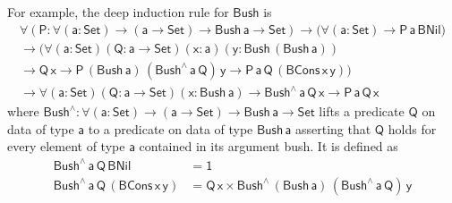 \documentclass[acmsmall,screen,review,anonymous]{acmart}
\theoremstyle{definition}
\begin{document}
For example, the deep induction rule for $\mathsf{Bush}$ is
\begin{multline*}
\mathsf{\forall (P : \forall (a : Set) \to (a \to Set) \to Bush\, a \to Set)
\to \big( \forall (a : Set) \to P\,a\,BNil \big)} \\
\mathsf{\to \big( \forall (a : Set) (Q : a \to Set) (x : a) (y : Bush\,(Bush\,a))} \\
\mathsf{\to Q\,x \to P\,(Bush\,a)\,(Bush^{\wedge}\,a\,Q)\,y \to P\,a\,Q\,(BCons\,x\,y) \big)} \\
\mathsf{\to \forall (a : Set) (Q : a \to Set) (x : Bush\,a) \to Bush^{\wedge}\,a\,Q\,x \to P\,a\,Q\,x }
\end{multline*}
where $\mathsf{Bush^{\wedge} : \forall (a : Set) \to (a \to Set) \to Bush\,a \to Set}$ lifts a predicate $\mathsf{Q}$ on data of type $\mathsf{a}$ to a predicate on data of type $\mathsf{Bush\,a}$ asserting that $\mathsf{Q}$ holds for every element of type $\mathsf{a}$ contained in its argument bush.
It is defined as
\begin{align*}
\mathsf{Bush^{\wedge}\,a\,Q\,BNil} &= \mathsf{1} \\
\mathsf{Bush^{\wedge}\,a\,Q\,(BCons\,x\,y)} &= \mathsf{Q\,x \times Bush^{\wedge}\,(Bush\,a)\,(Bush^{\wedge}\,a\,Q)\,y}
\end{align*}
\end{document}
